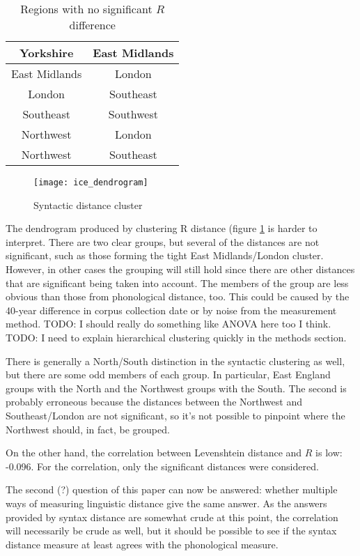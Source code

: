 \documentclass[11pt]{article}
\begin{document}
\begin{table}
\begin{tabular}{cc}
  Yorkshire & East Midlands \\ \hline
  East Midlands & London \\\hline
  London & Southeast \\\hline
  Southeast & Southwest \\\hline
  Northwest & London\\\hline
  Northwest & Southeast \\\hline
\end{tabular}
\caption{Regions with no significant $R$ difference}
\label{syntax-nonsig}
\end{table}

\begin{figure}
  \texttt{[image: ice\_dendrogram]}
\caption{Syntactic distance cluster}
\label{syntax-dendrogram}
\end{figure}

The dendrogram produced by clustering R distance (figure
\ref{syntax-dendrogram} is harder to
interpret. There are two clear groups, but several of the distances
are not significant, such as those forming the tight East
Midlands/London cluster. However, in other cases the grouping will still hold
since there are other distances that are significant being taken into
account. The members of the group are less obvious than those from
phonological distance, too. This could be caused by the 40-year
difference in corpus collection date or by noise from the measurement
method.
TODO: I should really do something like ANOVA here too I think.
TODO: I need to explain hierarchical clustering quickly in the methods
section.

There is generally a North/South distinction in the syntactic
clustering as well, but there are some odd members of each group. In
particular, East England groups with the North and the Northwest
groups with the South. The second is probably erroneous because the
distances between the Northwest and Southeast/London are not
significant, so it's not possible to pinpoint where the Northwest
should, in fact, be grouped.

On the other hand, the correlation between Levenshtein distance and
$R$ is low: -0.096. For the correlation, only the significant
distances were considered.

The second (?) question of this paper can now be answered: whether
multiple ways of measuring linguistic distance give the same
answer. As the answers provided by syntax distance are somewhat crude
at this point, the correlation will necessarily be crude as well, but
it should be possible to see if the syntax distance measure at least
agrees with the phonological measure.
\end{document}
